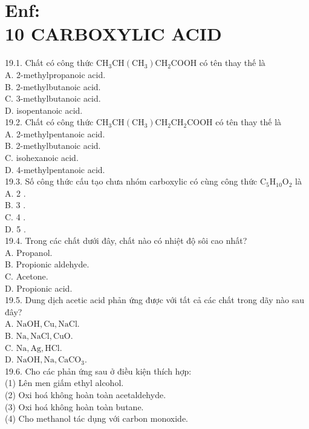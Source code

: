 \documentclass[10pt]{article}
\begin{document}
\section*{Enf: \\
 10 CARBOXYLIC ACID}
19.1. Chất có công thức $\mathrm{CH}_{3} \mathrm{CH}\left(\mathrm{CH}_{3}\right) \mathrm{CH}_{2} \mathrm{COOH}$ có tên thay thế là\\
A. 2-methylpropanoic acid.\\
B. 2-methylbutanoic acid.\\
C. 3-methylbutanoic acid.\\
D. isopentanoic acid.\\
19.2. Chất có công thức $\mathrm{CH}_{3} \mathrm{CH}\left(\mathrm{CH}_{3}\right) \mathrm{CH}_{2} \mathrm{CH}_{2} \mathrm{COOH}$ có tên thay thế là\\
A. 2-methylpentanoic acid.\\
B. 2-methylbutanoic acid.\\
C. isohexanoic acid.\\
D. 4-methylpentanoic acid.\\
19.3. Số công thức cấu tạo chưa nhóm carboxylic có cùng công thức $\mathrm{C}_{5} \mathrm{H}_{10} \mathrm{O}_{2}$ là\\
A. 2 .\\
B. 3 .\\
C. 4 .\\
D. 5 .\\
19.4. Trong các chất dưới đây, chất nào có nhiệt độ sôi cao nhất?\\
A. Propanol.\\
B. Propionic aldehyde.\\
C. Acetone.\\
D. Propionic acid.\\
19.5. Dung dịch acetic acid phản ứng được với tất cả các chất trong dãy nào sau đây?\\
A. $\mathrm{NaOH}, \mathrm{Cu}, \mathrm{NaCl}$.\\
B. $\mathrm{Na}, \mathrm{NaCl}, \mathrm{CuO}$.\\
C. $\mathrm{Na}, \mathrm{Ag}, \mathrm{HCl}$.\\
D. $\mathrm{NaOH}, \mathrm{Na}, \mathrm{CaCO}_{3}$.\\
19.6. Cho các phản ứng sau ở điều kiện thích hợp:\\
(1) Lên men giấm ethyl alcohol.\\
(2) Oxi hoá không hoàn toàn acetaldehyde.\\
(3) Oxi hoá không hoàn toàn butane.\\
(4) Cho methanol tác dụng với carbon monoxide.
\end{document}

